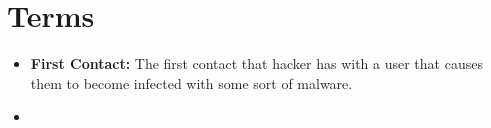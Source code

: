 \documentclass[letterpaper, onecolumn,10pt]{IEEEtran}
\begin{document}
        \section{Terms}
            \begin{itemize}
                \item \textbf{First Contact:} The first contact that hacker has with a user that causes them to become infected with some sort of malware.\\
                \item \textbf{}
            \end{itemize}

		
\end{document}
